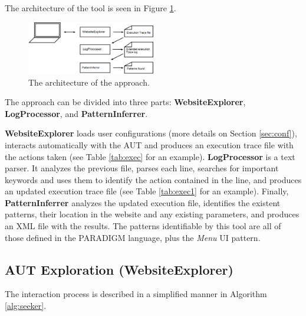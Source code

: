 \documentclass[conference]{IEEEtran}
\begin{document}
The architecture of the tool is seen in Figure \ref{fig:retool}.
\begin{figure}[!htb]
\centering
\includegraphics[width=0.5\textwidth]{retool}
\caption{The architecture of the approach.}
\label{fig:retool}
\end{figure}

The approach can be divided into three parts: \textbf{WebsiteExplorer}, \textbf{LogProcessor}, and \textbf{PatternInferrer}.

\textbf{WebsiteExplorer} loads user configurations (more details on Section \ref{sec:conf}), interacts automatically with the AUT and produces an execution trace file with the actions taken (see Table \ref{tab:exec} for an example). \textbf{LogProcessor} is a text parser. It analyzes the previous file, parses each line, searches for important keywords and uses them to identify the action contained in the line, and produces an updated execution trace file (see Table \ref{tab:exec1} for an example). Finally, \textbf{PatternInferrer} analyzes the updated execution file, identifies the existent patterns, their location in the website and any existing parameters, and produces an XML file with the results. The patterns identifiable by this tool are all of those defined in the PARADIGM language, plus the \textit{Menu} UI pattern. \\

\subsection{AUT Exploration (WebsiteExplorer)}\label{sec:inter}
The interaction process is described in a simplified manner in Algorithm \ref{alg:seeker}.
\end{document}
